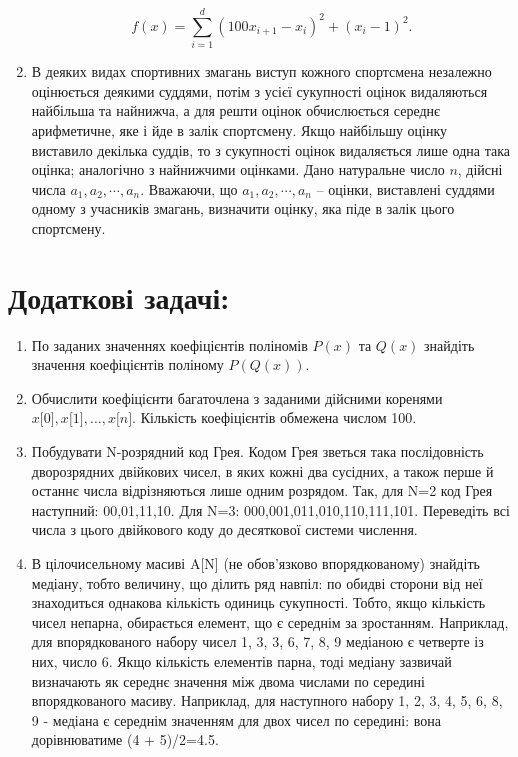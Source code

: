 \documentclass[a5paper,titlepage,openany,twoside,
]
{book_unv}%
\begin{document}
\begin{enumerate}
  $$ f(x) = \sum\limits_{i=1}^{d} (100x_{i+1} - x_{i})^{2} + (x_{i} - 1)^{2}. $$  

\item
  В деяких видах спортивних змагань виступ кожного спортсмена незалежно
  оцінюється деякими суддями, потім з усієї сукупності оцінок
  видаляються найбільша та найнижча, а для решти оцінок
  обчислюється середнє арифметичне, яке і йде в залік спортсмену. Якщо
  найбільшу оцінку виставило декілька суддів, то з сукупності
  оцінок видаляється лише одна така оцінка; аналогічно з
  найнижчими оцінками. Дано натуральне число $n$, дійсні числа
  \(a_{1},a_{2},\cdots,a_{n}\). Вважаючи, що
  \(a_{1},a_{2},\cdots,a_{n}\) -- оцінки, виставлені суддями одному з
  учасників змагань, визначити оцінку, яка піде в залік цього
  спортсмену.
\end{enumerate}

\section{Додаткові задачі:}

\begin{enumerate}
\def\labelenumi{\arabic{enumi})}
\setcounter{enumi}{17}
\item
По заданих значеннях коефіцієнтів поліномів $P(x)$ та $Q(x)$ знайдіть
значення коефіцієнтів поліному $P(Q(x))$.
\item
  Обчислити коефіцієнти багаточлена з заданими дійсними коренями 
$ x{[}0{]},x{[}1{]}, \ldots{}, x{[}n{]}$. Кількість коефіцієнтів обмежена
  числом 100.
\item
  Побудувати N-розрядний код Грея. Кодом Грея зветься така послідовність
  дворозрядних двійкових чисел, в яких кожні два сусідних, а також перше
  й останнє числа відрізняються лише одним розрядом. Так, для N=2 код
  Грея наступний: 00,01,11,10. Для N=3: 000,001,011,010,110,111,101.
  Переведіть всі числа з цього двійкового коду до десяткової системи
  числення.
\item
  В цілочисельному масиві A{[}N{]} (не обов'язково впорядкованому)
  знайдіть медіану, тобто величину, що ділить ряд навпіл: по обидві
  сторони від неї знаходиться однакова кількість одиниць сукупності.
  Тобто, якщо кількість чисел непарна, обирається елемент, що є середнім
  за зростанням. Наприклад, для впорядкованого набору чисел 1, 3, 3, 6,
  7, 8, 9 медіаною є четверте із них, число 6. Якщо кількість елементів
  парна, тоді медіану зазвичай визначають як середнє значення між двома
  числами по середині впорядкованого масиву. Наприклад, для наступного
  набору 1, 2, 3, 4, 5, 6, 8, 9 - медіана є середнім значенням для двох
  чисел по середині: вона дорівнюватиме (4 + 5)/2=4.5.
\end{enumerate}
\end{document}
